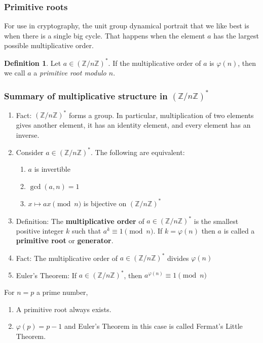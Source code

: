 \documentclass{article}
\theoremstyle{plain}
\theoremstyle{definition}
\newtheorem{definition}[theorem]{Definition}
\theoremstyle{remark}
\numberwithin{theorem}{section}
\newcommand{\ZZ}{\mathbb{Z}}
\begin{document}
\subsubsection{Primitive roots}


For use in cryptography, the unit group dynamical portrait that we like best is when there is a single big cycle.  That happens when the element $a$ has the largest possible multiplicative order.

\begin{definition}
  Let $a \in (\ZZ/n\ZZ)^*$.  If the multiplicative order of $a$ is $\varphi(n)$, then we call $a$ a \emph{primitive root modulo $n$}.
\end{definition}






\subsubsection{Summary of multiplicative structure in $(\ZZ/n\ZZ)^*$}

\begin{enumerate}
  \item Fact:  $(\ZZ/n\ZZ)^*$ forms a group.  In particular, multiplication of two elements gives another element, it has an identity element, and every element has an inverse.
  \item Consider $a \in (\ZZ/n\ZZ)^*$.  The following are equivalent:
    \begin{enumerate}
      \item $a$ is invertible
      \item $\gcd(a,n)=1$
      \item $x \mapsto ax \pmod{n}$ is bijective on $(\ZZ/n\ZZ)^*$
      \end{enumerate}
    \item Definition:  The \textbf{multiplicative order} of $a \in (\ZZ/n\ZZ)^*$ is the smallest positive integer $k$ such that $a^k \equiv 1 \pmod{n}$.  If $k = \varphi(n)$ then $a$ is called a \textbf{primitive root} or \textbf{generator}.
    \item Fact:  The multiplicative order of $a \in (\ZZ/n\ZZ)^*$ divides $\varphi(n)$
    \item Euler's Theorem:  If $a \in(\ZZ/n\ZZ)^*$, then $a^{\varphi(n)} \equiv 1 \pmod{n}$
    \end{enumerate}

    For $n = p$ a prime number,

    \begin{enumerate}
    \item A primitive root always exists.
    \item $\varphi(p) = p-1$ and Euler's Theorem in this case is called Fermat's Little Theorem.
    \end{enumerate}
\end{document}
